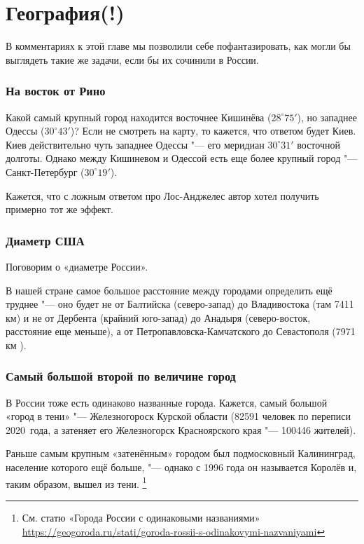 \documentclass[twoside]{book}
\begin{document}
\section{География(!)}

В комментариях к этой главе мы позволили себе пофантазировать, как могли бы выглядеть такие же задачи, если бы их сочинили в России.

\subsubsection*{На восток от Рино}
Какой самый крупный город находится восточнее Кишинёва ($28^\circ75'$), но западнее Одессы ($30^\circ43'$)? 
Если не смотреть на карту, то кажется, что ответом будет Киев. Киев действительно чуть западнее Одессы "--- его
меридиан $30^\circ31'$ восточной долготы.
Однако между Кишиневом и Одессой есть еще более крупный город "--- Санкт-Петербург
($30^\circ19'$).

Кажется, что с ложным ответом про Лос-Анджелес автор хотел получить примерно тот же эффект.


\subsubsection{Диаметр США}
Поговорим о «диаметре России». 

В нашей стране самое большое расстояние между городами определить ещё труднее "--- оно будет не от Балтийска 
(северо-запад) до Владивостока (там 7411 км) и не от Дербента (крайний юго-запад) до Анадыря (северо-восток, 
расстояние еще меньше), а от Петропавловска-Камчатского до Севастополя (7971 км%
).


\subsubsection{Самый большой второй по величине город}
В России тоже есть одинаково названные города. 
Кажется, самый большой «город в тени» "--- Железногороск Курской области (82591 человек по переписи 2020~года, 
а затеняет его Железногорск Красноярского края "--- 100446 жителей). 

Раньше самым крупным «затенённым» городом был подмосковный Калининград, население которого ещё больше, "---
однако с 1996 года он называется Королёв и, таким образом, вышел из тени.%
\footnote{См. статю «Города России с одинаковыми названиями» \url{https://geogoroda.ru/stati/goroda-rossii-s-odinakovymi-nazvaniyami}}
\end{document}
